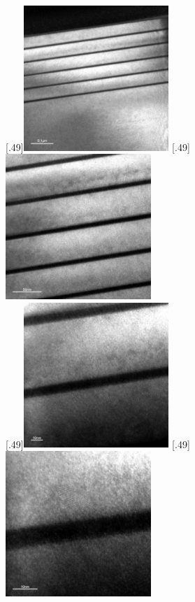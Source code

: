 \documentclass[a4paper,11pt,DIV=11]{scrartcl}
\begin{document}
\begin{figure}[htb]\centering
	[.49\linewidth]{\includegraphics[width=0.49\textwidth]{Versuchsdaten/11/34000x.jpg}}
	[.49\linewidth]{\includegraphics[width=0.49\textwidth]{Versuchsdaten/11/87000x.jpg}}\\
	[.49\linewidth]{\includegraphics[width=0.49\textwidth]{Versuchsdaten/11/185000x.jpg}}
	[.49\linewidth]{\includegraphics[width=0.49\textwidth]{Versuchsdaten/11/380000x.jpg}}

\end{figure}
\end{document}
